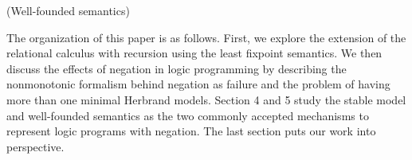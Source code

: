 (Well-founded semantics)

The organization of this paper is as follows. First, we 
explore the extension of the relational calculus with recursion 
using the least fixpoint semantics. We then discuss the effects 
of negation in logic programming by describing the nonmonotonic 
formalism behind negation as failure and the problem of 
having more than one minimal Herbrand models. Section 4 and 5 
study the stable model and well-founded semantics as the two 
commonly accepted mechanisms to represent logic programs with 
negation. The last section puts our work into perspective.